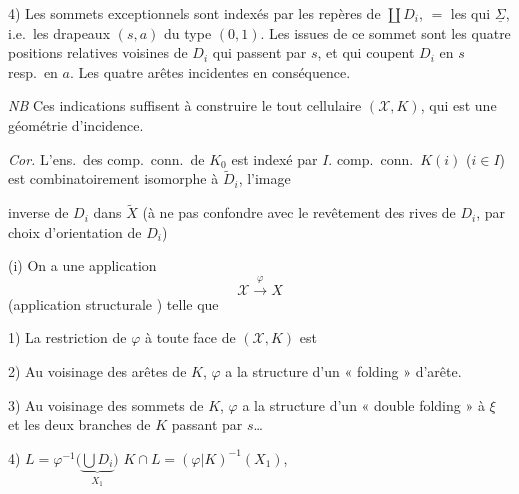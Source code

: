 \documentclass[11pt,a4paper]{article}
\begin{document}
4) Les sommets exceptionnels sont indexés par les repères de $\coprod D_i$,  $=$ les \struck{\ill{}} \ill{} qui \ill{}     $\underline{\Sigma}$,  i.e.\ les drapeaux $(s, a)$ du type $(0, 1)$.  Les  \struck{\ill{}} issues de ce sommet sont les quatre positions relatives voisines de $D_i$ \struck{\ill{} \ill{}} qui passent par $s$, et qui  coupent $D_i$ en $s$ resp.\ en $a$. Les quatre arêtes incidentes en conséquence.

\emph{NB} Ces indications suffisent à construire le tout cellulaire $(\mathcal{X}, K)$, qui est une géométrie d'incidence.

\emph{Cor.} L'ens.\ des comp.\ conn.\ de $K_0$ est indexé par $I$.    comp.\ conn.\ $K(i)$ ($i \in I$) est combinatoirement isomorphe à \struck{\ill{}} $\widetilde{D}_i$, l'image \ill{}

inverse de $D_i$ dans $\widetilde{X}$ (à ne pas confondre avec le revêtement des rives de $D_i$, \ill{} \ill{} par choix d'orientation de $D_i$)

(i) On a une application
\[
\mathcal{X} \xrightarrow{\ \varphi\ } X
\]
(application structurale ) telle que

1) La restriction de $\varphi$ à toute face de $(\mathcal{X}, K)$ est \ill{} \ill{}


2) Au voisinage des  \add{\ill{}} arêtes de $K$, \struck{\ill{} \ill{} \ill{}} $\varphi$ a la structure d'un « folding » d'arête.

3) Au voisinage des \struck{\ill{}} sommets de $K$, $\varphi$ a la structure d'un « double folding »  à $\xi$ et les deux branches de $K$ passant par $s$\ldots
{}

4)  \quad $L = \varphi^{-1}\bigl(\underbrace{\textstyle\bigcup D_i}_{X_1}\bigr)$ \quad {} \quad $K \cap L = (\varphi|K)^{-1}(X_1)$, \struck{\ill{}}
\end{document}

